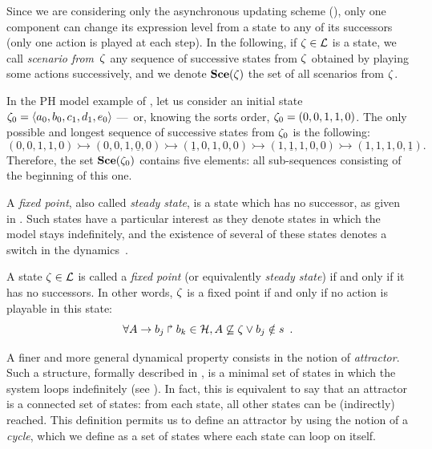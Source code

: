 Since we are considering only the asynchronous updating scheme (), only one component can change its expression level from a state to any of its successors (\ie only one action is played at each step). In the following, if $\zeta \in \mathcal{L}$ is a state,
we call \emph{scenario from~$\zeta$}
any sequence of successive states from $\zeta$
obtained by playing some actions successively,
and we denote $\mathbf{Sce}(\zeta)$ the set of all scenarios from $\zeta$.

\begin{example}
In the PH model example of , let us consider an initial state $\zeta_0 = \mbox{$\langle a_0, b_0, c_1, d_1, e_0 \rangle$}$ ---~or, knowing the sorts order, $\zeta_0 = (0, 0, 1, 1, 0)$. The only possible and longest sequence of successive states from $\zeta_0$ is the following:
  \[(0, 0, 1, 1,0) \rightarrowtail (0, 0, 1, \underline{0}, 0) \rightarrowtail (\underline{1}, 0, 1, 0, 0) \rightarrowtail (1, \underline{1}, 1, 0, 0) \rightarrowtail (1, 1, 1, 0, \underline{1}).\]
Therefore, the set $\mathbf{Sce}(\zeta_0)$ contains five elements: all sub-sequences consisting of the beginning of this one.
\end{example}

A \emph{fixed point}, also called \emph{steady state},
is a state which has no successor,
as given in .
Such states have a particular interest as they denote states in which the model
stays indefinitely,
and the existence of several of these states denotes a switch in the dynamics~\cite{wuensche1998genomic}.

\begin{definition}
\label{def:fixpoint}
  A state $\zeta \in \mathcal{L}$ is called a \emph{fixed point}
  (or equivalently \emph{steady state})
  if and only if it has no successors.
  In other words, $\zeta$ is a fixed point if and only if no action is playable in this state:
$$ \forall A\rightarrow b_j\Rsh b_k \in \mathcal{H}, A \not\subseteq \zeta \vee b_j \notin s \enspace. $$
\end{definition}

A finer and more general dynamical property consists in
the notion of \emph{attractor}.
Such a structure, formally described in ,
is a minimal set of states in which the system loops indefinitely (see ).
In fact, this is equivalent to say that an attractor is a connected set of states: from each state, all other states can be (indirectly) reached.
This definition permits us to define an attractor by using the notion of a \emph{cycle},
which we define as a set of states where each state can loop on itself.

